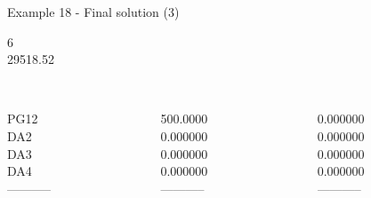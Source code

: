 \begin{frame}{Example 18 - Final solution (3)}

 6 \\
  29518.52\\

\begin{columns}[t]
\begin{column}{0.3\textwidth}
\\

PG12\\
DA2\\
DA3\\
DA4\\
-----------\\
\end{column}
\begin{column}{0.3\textwidth}
\\
500.0000\\
0.000000\\
0.000000\\
0.000000\\
-----------\\
\end{column}

\begin{column}{0.3\textwidth}
\\
0.000000\\
0.000000\\
0.000000\\
0.000000\\
-----------\\
\end{column}
\end{columns}
\end{frame}


